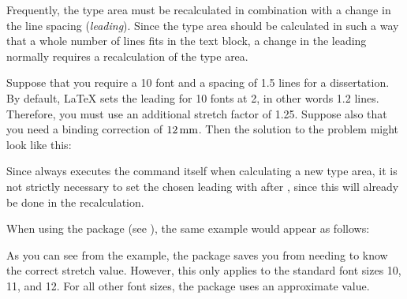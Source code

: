 Frequently, the type area must be recalculated in
combination with a change in the line spacing (\emph{leading}).
Since the type area should be calculated in such a way that a whole number of
lines fits in the text block, a change in the leading normally requires a
recalculation of the type area.
 
\begin{Example}
  Suppose that you require a 10 font and a spacing of 1.5 lines for a
  dissertation. By default, {\LaTeX} sets the leading for 10 fonts at
  2, in other words 1.2 lines. Therefore, you must use an additional
  stretch factor of 1.25. Suppose also that you need a binding correction of
  \(12\Unit{mm}\). Then the solution to the problem might look like this:
  Since  always executes the  command
  itself when calculating a new type area, it is not strictly necessary to
  set the chosen leading with  after ,
  since this will already be done in the recalculation.

  When using the %
   package (see \cite{package:setspace}), the
  same example would appear as follows:
\end{Example}

As you can see from the example, the 
package saves you from needing to know the correct stretch value. However,
this only applies to the standard font sizes 10, 11, and
12.  For all other font sizes, the package uses an approximate value.


